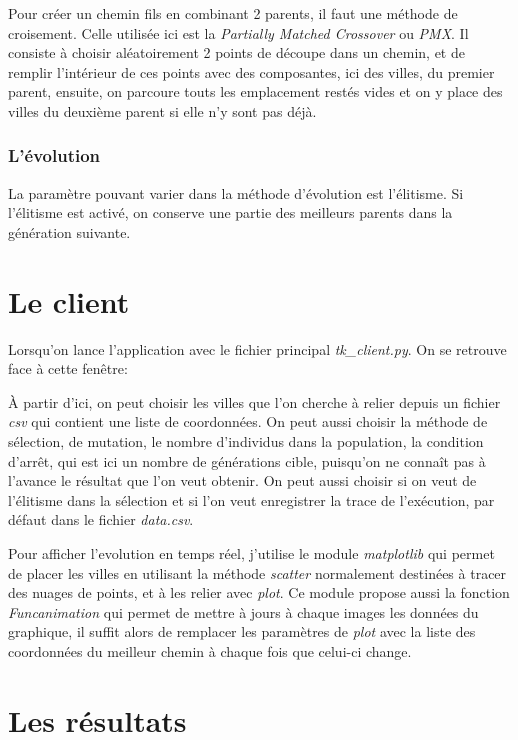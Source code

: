 \documentclass[12pt]{article}
\begin{document}
Pour créer un chemin fils en combinant 2 parents, il faut une méthode de croisement. Celle utilisée ici
est la \emph{Partially Matched Crossover} ou \emph{PMX}. Il consiste à choisir aléatoirement 2 points de découpe
dans un chemin, et de remplir l'intérieur de ces points avec des composantes, ici des villes, du premier parent,
ensuite, on parcoure touts les emplacement restés vides et on y place des villes du deuxième parent si elle n'y sont pas
déjà.

\subsubsection{L'évolution}

La paramètre pouvant varier dans la méthode d'évolution est l'élitisme. Si l'élitisme
est activé, on conserve une partie des meilleurs parents dans la génération suivante.


\section{Le client}

Lorsqu'on lance l'application avec le fichier principal \emph{tk\_client.py}. On se retrouve face à cette fenêtre:

À partir d'ici, on peut choisir les villes que l'on cherche à relier depuis un fichier \emph{csv} qui contient une liste
de coordonnées. On peut aussi choisir la méthode de sélection, de mutation, le nombre d'individus dans la population, la condition
d'arrêt, qui est ici un nombre de générations cible, puisqu'on ne connaît pas à l'avance le résultat que l'on veut obtenir.
On peut aussi choisir si on veut de l'élitisme dans la sélection et si l'on veut enregistrer la trace de l'exécution, par défaut
dans le fichier \emph{data.csv}.

Pour afficher l'evolution en temps réel, j'utilise le module \emph{matplotlib} qui permet de placer les villes en utilisant la méthode
\emph{scatter} normalement destinées à tracer des nuages de points, et à les relier avec \emph{plot}. Ce module propose aussi la fonction
\emph{Funcanimation} qui permet de mettre à jours à chaque images les données du graphique, il suffit alors de remplacer les paramètres
de \emph{plot} avec la liste des coordonnées du meilleur chemin à chaque fois que celui-ci change.

\section{Les résultats}
\label{sec-3}
\end{document}
